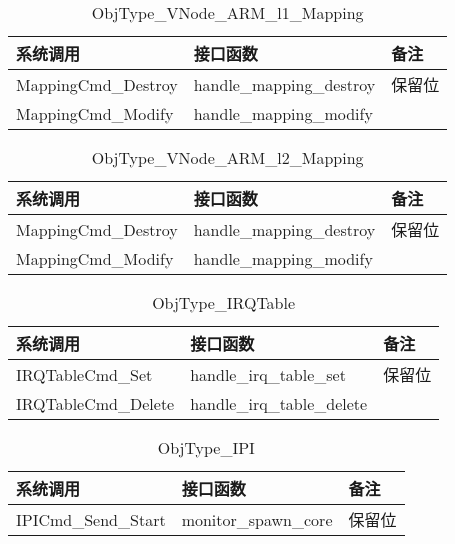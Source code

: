 \documentclass[a4paper, 12pt]{report}
\begin{document}
    \begin{table}[htbp]
        \centering
        \caption{ObjType\_VNode\_ARM\_l1\_Mapping}
        \begin{tabular}{lll}
            \toprule
            系统调用 & 接口函数 & 备注 \\
            \midrule
            MappingCmd\_Destroy & handle\_mapping\_destroy & 保留位 \\
            MappingCmd\_Modify & handle\_mapping\_modify & \\
            \bottomrule
        \end{tabular}
    \end{table}
    
    \begin{table}[htbp]
        \centering
        \caption{ObjType\_VNode\_ARM\_l2\_Mapping}
        \begin{tabular}{lll}
            \toprule
            系统调用 & 接口函数 & 备注 \\
            \midrule
            MappingCmd\_Destroy & handle\_mapping\_destroy & 保留位 \\
            MappingCmd\_Modify & handle\_mapping\_modify & \\
            \bottomrule
        \end{tabular}
    \end{table}
    
    \begin{table}[htbp]
        \centering
        \caption{ObjType\_IRQTable}
        \begin{tabular}{lll}
            \toprule
            系统调用 & 接口函数 & 备注 \\
            \midrule
            IRQTableCmd\_Set & handle\_irq\_table\_set & 保留位 \\
            IRQTableCmd\_Delete & handle\_irq\_table\_delete & \\
            \bottomrule
        \end{tabular}
    \end{table}
    
    \begin{table}[htbp]
        \centering
        \caption{ObjType\_IPI}
        \begin{tabular}{lll}
            \toprule
            系统调用 & 接口函数 & 备注 \\
            \midrule
            IPICmd\_Send\_Start & monitor\_spawn\_core & 保留位 \\
            \bottomrule
        \end{tabular}
    \end{table}
    
\end{document}
